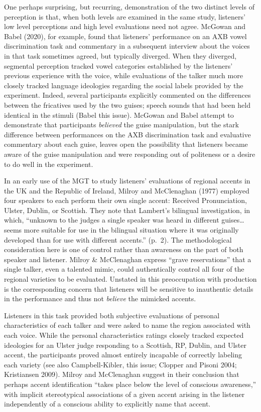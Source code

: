 \documentclass[
  letterpaper,
  DIV=11,
  numbers=noendperiod]{scrartcl}
\begin{document}
One perhaps surprising, but recurring, demonstration of the two distinct
levels of perception is that, when both levels are examined in the same
study, listeners' low level perceptions and high level evaluations need
not agree. McGowan and Babel (2020), for example, found that listeners'
performance on an AXB vowel discrimination task and commentary in a
subsequent interview about the voices in that task sometimes agreed, but
typically diverged. When they diverged, segmental perception tracked
vowel categories established by the listeners' previous experience with
the voice, while evaluations of the talker much more closely tracked
language ideologies regarding the social labels provided by the
experiment. Indeed, several participants explicitly commented on the
differences between the fricatives used by the two guises; speech sounds
that had been held identical in the stimuli (Babel this issue). McGowan
and Babel attempt to demonstrate that participants \emph{believed} the
guise manipulation, but the stark difference between performances on the
AXB discrimination task and evaluative commentary about each guise,
leaves open the possibility that listeners became aware of the guise
manipulation and were responding out of politeness or a desire to do
well in the experiment.

In an early use of the MGT to study listeners' evaluations of regional
accents in the UK and the Republic of Ireland, Milroy and McClenaghan
(1977) employed four speakers to each perform their own single accent:
Received Pronunciation, Ulster, Dublin, or Scottish. They note that
Lambert's bilingual investigation, in which, ``unknown to the judges a
single speaker was heard in different guises\ldots{} seems more suitable
for use in the bilingual situation where it was originally developed
than for use with different accents.'' (p.~2). The methodological
consideration here is one of control rather than awareness on the part
of both speaker and listener. Milroy \& McClenaghan express ``grave
reservations'' that a single talker, even a talented mimic, could
authentically control all four of the regional varieties to be
evaluated. Unstated in this preoccupation with production is the
corresponding concern that listeners will be sensitive to inauthentic
details in the performance and thus not \emph{believe} the mimicked
accents.

Listeners in this task provided both subjective evaluations of personal
characteristics of each talker and were asked to name the region
associated with each voice. While the personal characteristics ratings
closely tracked expected ideologies for an Ulster judge responding to a
Scottish, RP, Dublin, and Ulster accent, the participants proved almost
entirely incapable of correctly labeling each variety (see also
Campbell-Kibler, this issue; Clopper and Pisoni 2004; Kristiansen 2009).
Milroy and McClenaghan suggest in their conclusion that perhaps accent
identification ``takes place below the level of conscious awareness,''
with implicit stereotypical associations of a given accent arising in
the listener independently of a conscious ability to explicitly name
that accent.
\end{document}
